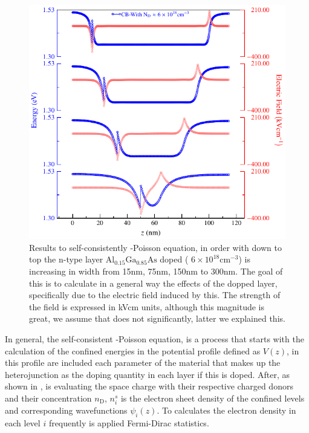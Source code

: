 \begin{figure}[ht!]
	\centering
	\includegraphics[width=\textwidth]{../figures/chapter-3/poisson/build/poisson.pdf}
	\caption{Results to self-consistently \sch-Poisson equation, in order with down to top the n-type layer $\mathrm{Al_{0.15}Ga_{0.85}As}$ doped ( $6\times 10^{18} \mathrm{cm}^{-3}$) is increasing in width from 15nm, 75nm, 150nm to 300nm. The goal of this is to calculate in a general way the effects of the dopped layer, specifically due to the electric field induced by this.  The strength of the field is expressed in kVcm units, although this magnitude is great, we assume that does not significantly, latter we explained this.}
	\label{fig:chapter-3-pr-poisson-1}
\end{figure}
In general, the self-consistent \sch-Poisson equation, is a process that starts with the calculation of the confined energies in the potential profile defined as $V(z)$,  in this profile are included each parameter of the material that makes up the heterojunction as the doping quantity in each layer if this is doped. After, as shown in , is evaluating the space charge with their respective charged donors and their concentration $n_{\mathrm{D}}$,  $n_{i}^{s}$ is the electron sheet density of the confined levels and corresponding wavefunctions $\psi_{i}(z)$. To  calculates the electron density in each level $i$ frequently is applied Fermi-Dirac statistics\cite{cassan2000onthereduction,ando1987calculation,bastard1990wave}. 

